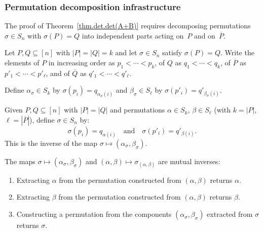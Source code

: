 \subsubsection{Permutation decomposition infrastructure}

The proof of Theorem~\ref{thm.det.det(A+B)} requires decomposing
permutations $\sigma \in S_n$ with $\sigma(P) = Q$ into independent
parts acting on~$P$ and on~$\overline{P}$.

\begin{definition}
\label{def.extract}
\leanhelper
\leanok
Let $P,Q\subseteq [n]$ with $|P|=|Q|=k$ and let $\sigma\in S_n$
satisfy $\sigma(P) = Q$.  Write the elements of $P$ in increasing
order as $p_1 < \cdots < p_k$, of $Q$ as $q_1 < \cdots < q_k$,
of $\overline{P}$ as $p'_1 < \cdots < p'_\ell$, and of
$\overline{Q}$ as $q'_1 < \cdots < q'_\ell$.

Define $\alpha_\sigma \in S_k$ by
$\sigma(p_i) = q_{\alpha_\sigma(i)}$ and
$\beta_\sigma \in S_\ell$ by
$\sigma(p'_i) = q'_{\beta_\sigma(i)}$.
\end{definition}

\begin{definition}
\label{def.constructSigma}
\leanhelper
\leanok
Given $P,Q\subseteq [n]$ with $|P|=|Q|$ and permutations
$\alpha\in S_k$, $\beta\in S_\ell$ (with $k=|P|$, $\ell=|\overline{P}|$),
define $\sigma \in S_n$ by:
\[
\sigma(p_i) = q_{\alpha(i)} \quad\text{and}\quad
\sigma(p'_i) = q'_{\beta(i)}.
\]
This is the inverse of the map $\sigma \mapsto (\alpha_\sigma,\beta_\sigma)$.
\end{definition}

\begin{lemma}
\label{lem.roundtrip}
\leanhelper
\leanok
The maps $\sigma \mapsto (\alpha_\sigma, \beta_\sigma)$ and
$(\alpha,\beta) \mapsto \sigma_{(\alpha,\beta)}$
are mutual inverses:
\begin{enumerate}
\item Extracting $\alpha$ from the permutation constructed from $(\alpha,\beta)$ returns $\alpha$.
\item Extracting $\beta$ from the permutation constructed from $(\alpha,\beta)$ returns $\beta$.
\item Constructing a permutation from the components $(\alpha_\sigma, \beta_\sigma)$ extracted from $\sigma$ returns $\sigma$.
\end{enumerate}
\end{lemma}

